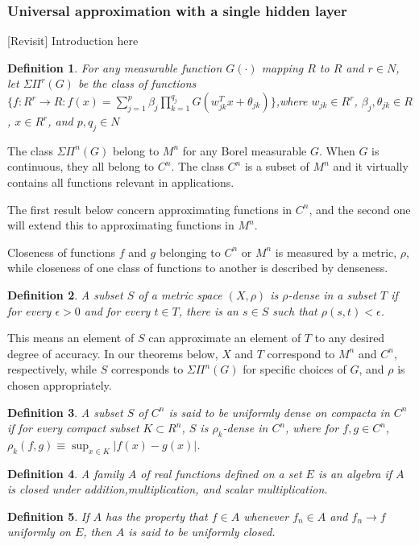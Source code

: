 \documentclass[12pt]{amsart}
\newtheorem{definition}{Definition}
\theoremstyle{plain}
\theoremstyle{definition}
\theoremstyle{remark}
\numberwithin{equation}{section}
\numberwithin{thm}{section}
\begin{document}
\subsubsection{\textbf{Universal approximation with a single hidden layer}}

[Revisit] Introduction here

\begin{definition}
    For any measurable function $G(\cdot)$ mapping $R$ to $R$ and $r \in N$, let $\Sigma \Pi^r (G)$ be the class of functions 
    $\{ f: R^r \to R :  f(x)=\sum_{j=1}^{p} \beta_{j} \prod_{k=1}^{q_j} G(w_{jk}^{T}x+\theta_{jk})\}$,where $w_{jk} \in R^r$, $\beta_{j}, \theta_{jk} \in R$, $x \in R^r$, and $p, q_j \in N$
\end{definition}
The class $\Sigma\Pi^n(G)$ belong to $M^n$ for any Borel measurable $G$. When $G$ is continuous, they all belong to $C^n$. The class $C^n$ is a subset of $M^n$ and it virtually contains all functions relevant in applications. 

The first result below concern approximating functions in $C^n$, and the second one will extend this to approximating functions in $M^n$.

Closeness of functions $f$ and $g$ belonging to $C^n$ or $M^n$ is measured by a metric, $\rho$, while closeness of one class of functions to another is described by denseness.

\begin{definition}
    A subset $S$ of a metric space $(X,\rho)$ is $\rho$-dense in a subset $T$ if for every $\epsilon>0$ and for every $t \in T$, there is an $s \in S$ such that $\rho(s,t)<\epsilon$.
\end{definition}
This means an element of $S$ can approximate an element of $T$ to any desired degree of accuracy. In our theorems below, $X$ and $T$ correspond to $M^n$ and $C^n$, respectively, while $S$ corresponds to $\Sigma \Pi^n (G)$ for specific choices of $G$, and $\rho$ is chosen appropriately.
\begin{definition}
    A subset $S$ of $C^n$ is said to be uniformly dense on compacta in $C^n$ if for every compact subset $K \subset R^n$, $S$ is $\rho_k$-dense in $C^n$, where for $f,g \in C^n$, $\rho_k(f,g)\equiv \sup_{x\in K} |f(x)-g(x)|$.
\end{definition}


\begin{definition}
    A family $A$ of real functions defined on a set $E$ is an algebra if $A$ is closed under addition,multiplication, and scalar multiplication.
\end{definition}
\begin{definition}%
If $A$ has the property that $f \in A$ whenever $f_n \in A$ and $f_n \to f$ uniformly on $E$, then $A$ is said to be uniformly closed.
\end{definition}
\end{document}
